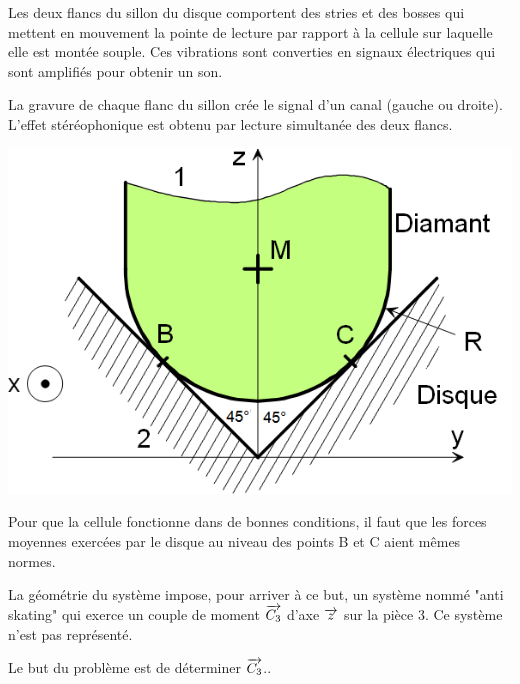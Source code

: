 \documentclass[10pt]{article}
\begin{document}
\begin{minipage}[c]{.58\linewidth}
Les deux flancs du sillon du disque comportent des stries et des bosses qui mettent en mouvement la pointe de lecture par rapport à la cellule sur laquelle elle est montée souple. Ces vibrations sont converties en signaux électriques qui sont amplifiés pour obtenir un son.

La gravure de chaque flanc du sillon crée le signal d'un canal (gauche ou droite). L'effet stéréophonique est obtenu par lecture simultanée des deux flancs.

\end{minipage} \hfill
\begin{minipage}[c]{.4\linewidth}
\begin{center}
\includegraphics[width=.95\textwidth]{images/fig5}
\end{center}
\end{minipage}


Pour que la cellule fonctionne dans de bonnes conditions, il faut que les forces moyennes exercées par le disque au niveau des points B et C aient mêmes normes.

La géométrie du système impose, pour arriver à ce but, un système nommé "anti skating" qui exerce un couple de moment  $\overrightarrow{C_3}$ d'axe $\overrightarrow{z}$ sur la pièce 3. Ce système n'est pas représenté.  

\begin{obj}
Le but du problème est de déterminer $\overrightarrow{C_3}$..
\end{obj}
\end{document}
